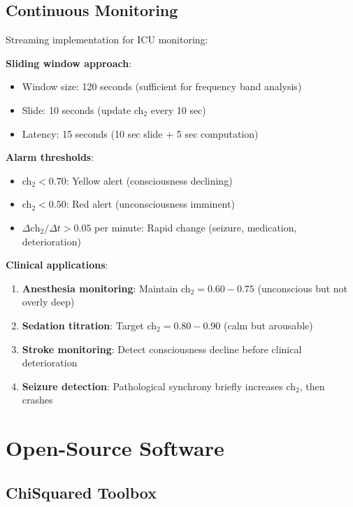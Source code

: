 \subsection{Continuous Monitoring}

\begin{proposition}\label{prop:realtime}
Streaming implementation for ICU monitoring:

\textbf{Sliding window approach}:
\begin{itemize}
\item Window size: 120 seconds (sufficient for frequency band analysis)
\item Slide: 10 seconds (update ch$_2$ every 10 sec)
\item Latency: 15 seconds (10 sec slide + 5 sec computation)
\end{itemize}

\textbf{Alarm thresholds}:
\begin{itemize}
\item ch$_2 < 0.70$: Yellow alert (consciousness declining)
\item ch$_2 < 0.50$: Red alert (unconsciousness imminent)
\item $\Delta \text{ch}_2 / \Delta t > 0.05$ per minute: Rapid change (seizure, medication, deterioration)
\end{itemize}

\textbf{Clinical applications}:
\begin{enumerate}
\item \textbf{Anesthesia monitoring}: Maintain ch$_2 = 0.60-0.75$ (unconscious but not overly deep)
\item \textbf{Sedation titration}: Target ch$_2 = 0.80-0.90$ (calm but arousable)
\item \textbf{Stroke monitoring}: Detect consciousness decline before clinical deterioration
\item \textbf{Seizure detection}: Pathological synchrony briefly increases ch$_2$, then crashes
\end{enumerate}
\end{proposition}

\section{Open-Source Software}

\subsection{ChiSquared Toolbox}

